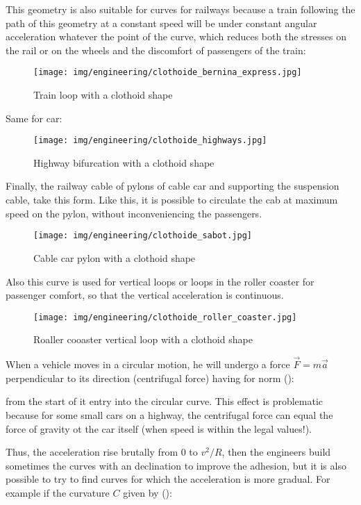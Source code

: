 	This geometry is also suitable for curves for railways because a train following the path of this geometry at a constant speed will be under constant angular acceleration whatever the point of the curve, which reduces both the stresses on the rail or on the wheels and the discomfort of passengers of the train:
	\begin{figure}[H]
		\centering
		\texttt{[image: img/engineering/clothoide\_bernina\_express.jpg]}
		\caption{Train loop with a clothoid shape}
	\end{figure}
	Same for car:
	\begin{figure}[H]
		\centering
		\texttt{[image: img/engineering/clothoide\_highways.jpg]}
		\caption{Highway bifurcation with a clothoid shape}
	\end{figure}
	Finally, the railway cable of pylons of cable car and supporting the suspension cable, take this form. Like this, it is possible to circulate the cab at maximum speed on the pylon, without inconveniencing the passengers.
	\begin{figure}[H]
		\centering
		\texttt{[image: img/engineering/clothoide\_sabot.jpg]}
		\caption{Cable car pylon with a clothoid shape}
	\end{figure}
	Also this curve is used for vertical loops or loops in the roller coaster for passenger comfort, so that the vertical acceleration is continuous.
	\begin{figure}[H]
		\centering
		\texttt{[image: img/engineering/clothoide\_roller\_coaster.jpg]}
		\caption{Roaller cooaster vertical loop with a clothoid shape}
	\end{figure}
	When a vehicle moves in a circular motion, he will undergo a force $\vec{F}=m\vec{a}$ perpendicular to its direction (centrifugal force) having for norm ():
	
	from the start of it entry into the circular curve. This effect is problematic because for some small cars on a highway, the centrifugal force can equal the force of gravity ot the car itself (when speed is within the legal values!).

	Thus, the acceleration rise brutally from $0$ to $v^2/R$, then the engineers build sometimes the curves with an declination to improve the adhesion, but it is also possible to try to find curves for which the acceleration is more gradual. For example if the curvature $C$ given by ():
	
